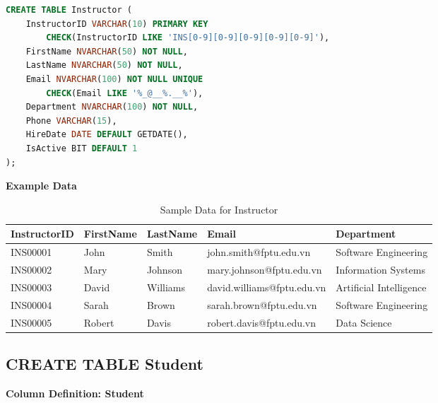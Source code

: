 \documentclass[12pt,a4paper]{report}
\begin{document}
\vspace{0.3cm}

\begin{lstlisting}[language=SQL, caption=Create Table Instructor]
CREATE TABLE Instructor (
    InstructorID VARCHAR(10) PRIMARY KEY 
        CHECK(InstructorID LIKE 'INS[0-9][0-9][0-9][0-9][0-9]'),
    FirstName NVARCHAR(50) NOT NULL,
    LastName NVARCHAR(50) NOT NULL,
    Email NVARCHAR(100) NOT NULL UNIQUE 
        CHECK(Email LIKE '%_@__%.__%'),
    Department NVARCHAR(100) NOT NULL,
    Phone VARCHAR(15),
    HireDate DATE DEFAULT GETDATE(),
    IsActive BIT DEFAULT 1
);
\end{lstlisting}

\textbf{Example Data}

\begin{table}[ht]
\centering
\small
\begin{tabular}{|l|l|l|p{5cm}|p{4cm}|}
\hline
\textbf{InstructorID} & \textbf{FirstName} & \textbf{LastName} & \textbf{Email} & \textbf{Department} \\ \hline
INS00001 & John & Smith & john.smith@fptu.edu.vn & Software Engineering \\ \hline
INS00002 & Mary & Johnson & mary.johnson@fptu.edu.vn & Information Systems \\ \hline
INS00003 & David & Williams & david.williams@fptu.edu.vn & Artificial Intelligence \\ \hline
INS00004 & Sarah & Brown & sarah.brown@fptu.edu.vn & Software Engineering \\ \hline
INS00005 & Robert & Davis & robert.davis@fptu.edu.vn & Data Science \\ \hline
\end{tabular}
\caption{Sample Data for Instructor}
\label{tab:instructor_data}
\end{table}

\vspace{9cm}

\subsection{CREATE TABLE Student}

\textbf{Column Definition: Student}
\end{document}
